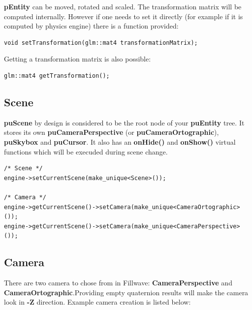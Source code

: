 \documentclass{article}
\begin{document}
\indent \indent \textbf{pEntity} can be moved, rotated and scaled. The transformation matrix will be computed internally. However if one needs to set it directly (for example if it is computed by physics engine) there is a function provided:

\begin{lstlisting}
void setTransformation(glm::mat4 transformationMatrix);
\end{lstlisting}

\indent \indent Getting a transformation matrix is also possible:

\begin{lstlisting}
glm::mat4 getTransformation();
\end{lstlisting}

\subsection{Scene}\label{sec:Scene}
\indent \indent \textbf{puScene} by design is considered to be the root node of your \textbf{puEntity} tree. It stores its own \textbf{puCameraPerspective} (or \textbf{puCameraOrtographic}), \textbf{puSkybox} and \textbf{puCursor}. It also has an \textbf{onHide()} and \textbf{onShow()} virtual functions which will be execuded during scene change.

\begin{lstlisting}
/* Scene */
engine->setCurrentScene(make_unique<Scene>());

/* Camera */
engine->getCurrentScene()->setCamera(make_unique<CameraOrtographic>());
engine->getCurrentScene()->setCamera(make_unique<CameraPerspective>());
\end{lstlisting}

\subsection{Camera}\label{sec:Camera}

\indent \indent There are two camera to chose from in Fillwave: \textbf{CameraPerspective} and \textbf{CameraOrtographic}.Providing empty quaternion results will make the camera look in \textbf{-Z} direction. Example camera creation is listed below:
\end{document}
